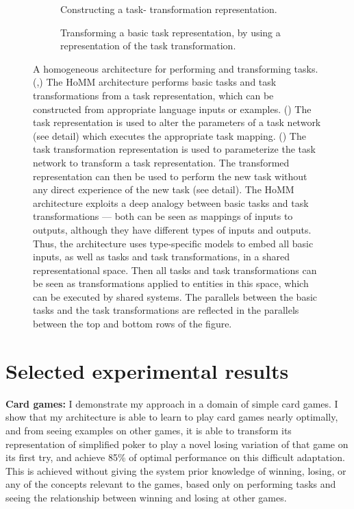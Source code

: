 \documentclass[12pt]{article}
\begin{document}
\begin{figure}[htbp]
{\begin{tikzpicture}[auto]
\end{tikzpicture}
}
\begin{subfigure}[t]{0.4\textwidth}
\vspace{-1em}
\caption{Constructing a task-\phantom{blahblahblahblah}  transformation representation.}\label{fig:HoMM_architecture:constructing_meta}
\end{subfigure}%
\begin{subfigure}[t]{0.6\textwidth}
\vspace{-1em}
\caption{Transforming a basic task representation, by using a representation of the task transformation.}\label{fig:HoMM_architecture:performing_meta}
\end{subfigure}
\caption[Performing and transforming tasks with the HoMM architecture.]{A homogeneous architecture for performing and transforming tasks. (,) The HoMM architecture performs basic tasks and task transformations from a task representation, which can be constructed from appropriate language inputs or examples.  () The task representation is used to alter the parameters of a task network (see detail) which executes the appropriate task mapping. () The task transformation representation is used to parameterize the task network to transform a task representation. The transformed representation can then be used to perform the new task without any direct experience of the new task (see detail). The HoMM architecture exploits a deep analogy between basic tasks and task transformations --- both can be seen as mappings of inputs to outputs, although they have different types of inputs and outputs. Thus, the architecture uses type-specific models to embed all basic inputs, as well as tasks and task transformations, in a shared representational space. Then all tasks and task transformations can be seen as transformations applied to entities in this space, which can be executed by shared systems. The parallels between the basic tasks and the task transformations are reflected in the parallels between the top and bottom rows of the figure.} \label{fig:HoMM_architecture}
\end{figure}



\section{Selected experimental results}
\textbf{Card games:} I demonstrate my approach in a domain of simple card games. I show that my architecture is able to learn to play card games nearly optimally, and from seeing examples on other games, it is able to transform its representation of simplified poker to play a novel losing variation of that game on its first try, and achieve 85\% of optimal performance on this difficult adaptation. This is achieved without giving the system prior knowledge of winning, losing, or any of the concepts relevant to the games, based only on performing tasks and seeing the relationship between winning and losing at other games.
\end{document}
